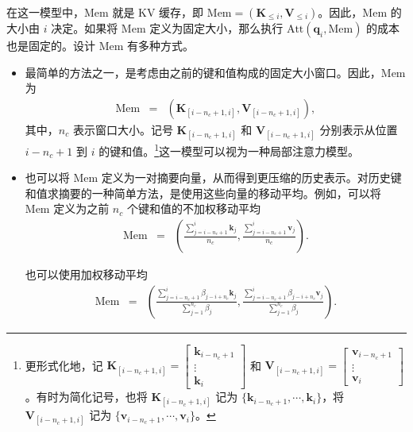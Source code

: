 在这一模型中，$\mathrm{Mem}$ 就是 KV 缓存，即 $\mathrm{Mem} = (\mathbf{K}_{\le i}, \mathbf{V}_{\le i})$。因此，$\mathrm{Mem}$ 的大小由 $i$ 决定。如果将 $\mathrm{Mem}$ 定义为固定大小，那么执行 $\mathrm{Att}(\mathbf{q}_i,\mathrm{Mem})$ 的成本也是固定的。设计 $\mathrm{Mem}$ 有多种方式。

\begin{itemize}
\item \vspace{0.5em} 最简单的方法之一，是考虑由之前的键和值构成的固定大小窗口。因此，$\mathrm{Mem}$ 为
    \begin{eqnarray}
    \mathrm{Mem} & = & (\mathbf{K}_{[i - n_c + 1,i]},\mathbf{V}_{[i - n_c + 1,i]}),
    \end{eqnarray}
    \noindent 其中，$n_c$ 表示窗口大小。记号 $\mathbf{K}_{[i - n_c + 1,i]}$ 和 $\mathbf{V}_{[i - n_c + 1,i]}$ 分别表示从位置 $i-n_c+1$ 到 $i$ 的键和值。\footnote{更形式化地，记 $\mathbf{K}_{[i - n_c + 1,i]} = \begin{bmatrix} \mathbf{k}_{i - n_c + 1} \\ \vdots \\ \mathbf{k}_{i} \end{bmatrix}$ 和 $\mathbf{V}_{[i - n_c + 1,i]} = \begin{bmatrix} \mathbf{v}_{i - n_c + 1} \\ \vdots \\ \mathbf{v}_{i} \end{bmatrix}$。有时为简化记号，也将 $\mathbf{K}_{[i - n_c + 1,i]}$ 记为 $\{\mathbf{k}_{i - n_c + 1},\cdots,\mathbf{k}_{i}\}$，将 $\mathbf{V}_{[i - n_c + 1,i]}$ 记为 $\{\mathbf{v}_{i - n_c + 1},\cdots,\mathbf{v}_{i}\}$。}这一模型可以视为一种局部注意力模型。
\item \vspace{0.5em} 也可以将 $\mathrm{Mem}$ 定义为一对摘要向量，从而得到更压缩的历史表示。对历史键和值求摘要的一种简单方法，是使用这些向量的移动平均。例如，可以将 $\mathrm{Mem}$ 定义为之前 $n_c$ 个键和值的不加权移动平均
    \begin{eqnarray}
    \mathrm{Mem} & = & \left(\frac{\sum_{j=i - n_c + 1}^{i} \mathbf{k}_{j}}{n_c} , \frac{\sum_{j=i - n_c + 1}^{i} \mathbf{v}_{j}}{n_c} \right).
    \end{eqnarray}

    也可以使用加权移动平均
    \begin{eqnarray}
    \mathrm{Mem} & = & \left( \frac{\sum_{j=i - n_c + 1}^{i} \beta_{j - i + n_c} \mathbf{k}_{j}} {\sum_{j=1}^{n_c} \beta_j} , \frac{\sum_{j=i - n_c + 1}^{i} \beta_{j - i + n_c} \mathbf{v}_{j}}{\sum_{j=1}^{n_c} \beta_j} \right).
    \end{eqnarray}


\end{itemize}
